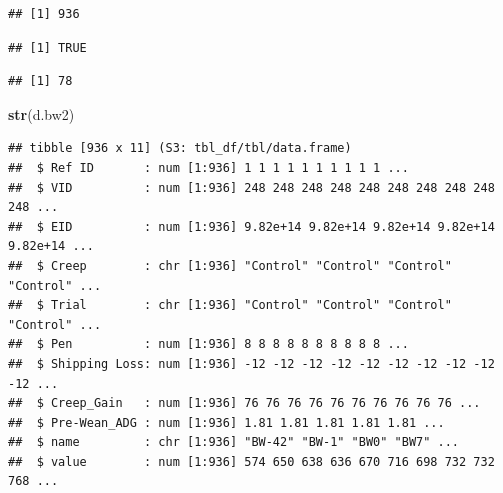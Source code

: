 \documentclass[
]{book}
\newenvironment{Shaded}{\begin{snugshade}}{\end{snugshade}}
\newcommand{\AttributeTok}[1]{\textcolor[rgb]{0.13,0.29,0.53}{#1}}
\newcommand{\DecValTok}[1]{\textcolor[rgb]{0.00,0.00,0.81}{#1}}
\newcommand{\FunctionTok}[1]{\textcolor[rgb]{0.13,0.29,0.53}{\textbf{#1}}}
\newcommand{\NormalTok}[1]{#1}
\newcommand{\OtherTok}[1]{\textcolor[rgb]{0.56,0.35,0.01}{#1}}
\newcommand{\SpecialCharTok}[1]{\textcolor[rgb]{0.81,0.36,0.00}{\textbf{#1}}}
\begin{document}
\begin{Shaded}
\end{Shaded}

\begin{verbatim}
## [1] 936
\end{verbatim}

\begin{Shaded}
\end{Shaded}

\begin{verbatim}
## [1] TRUE
\end{verbatim}

\begin{Shaded}
\end{Shaded}

\begin{verbatim}
## [1] 78
\end{verbatim}

\begin{Shaded}
\begin{Highlighting}[]
\FunctionTok{str}\NormalTok{(d.bw2)}
\end{Highlighting}
\end{Shaded}

\begin{verbatim}
## tibble [936 x 11] (S3: tbl_df/tbl/data.frame)
##  $ Ref ID       : num [1:936] 1 1 1 1 1 1 1 1 1 1 ...
##  $ VID          : num [1:936] 248 248 248 248 248 248 248 248 248 248 ...
##  $ EID          : num [1:936] 9.82e+14 9.82e+14 9.82e+14 9.82e+14 9.82e+14 ...
##  $ Creep        : chr [1:936] "Control" "Control" "Control" "Control" ...
##  $ Trial        : chr [1:936] "Control" "Control" "Control" "Control" ...
##  $ Pen          : num [1:936] 8 8 8 8 8 8 8 8 8 8 ...
##  $ Shipping Loss: num [1:936] -12 -12 -12 -12 -12 -12 -12 -12 -12 -12 ...
##  $ Creep_Gain   : num [1:936] 76 76 76 76 76 76 76 76 76 76 ...
##  $ Pre-Wean_ADG : num [1:936] 1.81 1.81 1.81 1.81 1.81 ...
##  $ name         : chr [1:936] "BW-42" "BW-1" "BW0" "BW7" ...
##  $ value        : num [1:936] 574 650 638 636 670 716 698 732 732 768 ...
\end{verbatim}
\end{document}
